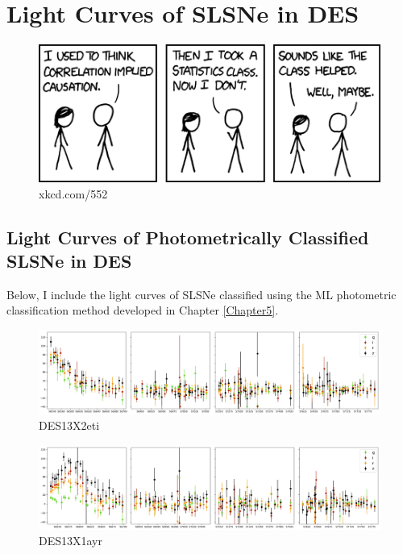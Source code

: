 \chapter{Light Curves of SLSNe in DES}
\label{AppendixA}

\begin{figure}[H]
  \centering
  \includegraphics[width=\textwidth]{Figures/xkcd/appendix.png}
  \caption*{xkcd.com/552}
\end{figure}

\section{Light Curves of Photometrically Classified SLSNe in DES}
Below, I include the light curves of SLSNe classified using the ML photometric classification method developed in Chapter \ref{Chapter5}.

\begin{figure}[H]
  \centering
  \includegraphics[width=\textwidth]{Figures/Appendix/CNN/1247904.png}
  \caption{DES13X2eti}
\end{figure}

\begin{figure}[H]
  \centering
  \includegraphics[width=\textwidth]{Figures/Appendix/CNN/1249610.png}
  \caption{DES13X1ayr}
\end{figure}

